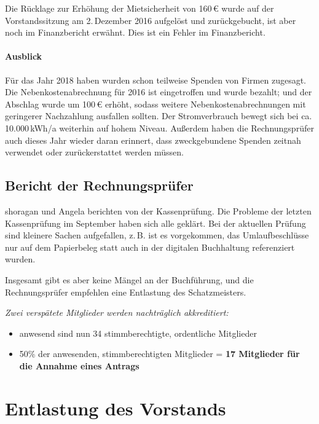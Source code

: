 \documentclass{s0minutes}
\begin{document}
Die Rücklage zur Erhöhung der Mietsicherheit von 160\,€ wurde auf der
Vorstandssitzung am 2.\,Dezember 2016 aufgelöst und zurückgebucht, ist aber noch
im Finanzbericht erwähnt. Dies ist ein Fehler im Finanzbericht.

\paragraph{Ausblick}
Für das Jahr 2018 haben wurden schon teilweise Spenden von Firmen zugesagt. Die
Nebenkostenabrechnung für 2016 ist eingetroffen und wurde bezahlt; und der
Abschlag wurde um 100\,€ erhöht, sodass weitere Nebenkostenabrechnungen mit
geringerer Nachzahlung ausfallen sollten. Der Stromverbrauch bewegt sich bei ca.
10.000\,kWh/a weiterhin auf hohem Niveau. Außerdem haben die Rechnungsprüfer
auch dieses Jahr wieder daran erinnert, dass zweckgebundene Spenden zeitnah
verwendet oder zurückerstattet werden müssen.

\subsection{Bericht der Rechnungsprüfer}

shoragan und Angela berichten von der Kassenprüfung. Die Probleme der letzten
Kassenprüfung im September haben sich alle geklärt. Bei der aktuellen Prüfung
sind kleinere Sachen aufgefallen, z.\,B. ist es vorgekommen, das Umlaufbeschlüsse
nur auf dem Papierbeleg statt auch in der digitalen Buchhaltung referenziert
wurden.

Insgesamt gibt es aber keine Mängel an der Buchführung, und die Rechnungsprüfer
empfehlen eine Entlastung des Schatzmeisters.

{ \itshape \vspace{\baselineskip}
  Zwei verspätete Mitglieder werden nachträglich akkreditiert:
  \begin{itemize}[nosep]
    \item anwesend sind nun 34 stimmberechtigte, ordentliche Mitglieder
    \item 50\% der anwesenden, stimmberechtigten Mitglieder =
      \textbf{17 Mitglieder für die Annahme eines Antrags}
  \end{itemize}
}

\section{Entlastung des Vorstands}
\end{document}
